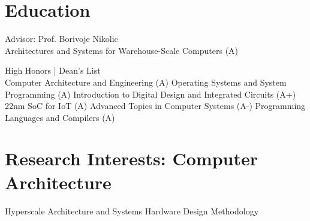 \documentclass[]{deedy-resume-openfont}
\begin{document}
%
%

%
%



\section{Education}


Advisor: Prof. Borivoje Nikolic
\vspace*{3pt}
\\
 Architectures and Systems for Warehouse-Scale Computers (A)

\vspace{6pt}

High Honors | Dean's List
\vspace*{3pt}
\\
 Computer Architecture and Engineering (A)
\textbullet{}
Operating Systems and System Programming (A)
\textbullet{}
Introduction to Digital Design and Integrated Circuits (A+)
\textbullet{}
22nm SoC for IoT (A)
\textbullet{}
Advanced Topics in Computer Systems (A-)
\textbullet{}
Programming Languages and Compilers (A)

\sectionsep

\section{Research Interests: Computer Architecture}
Hyperscale Architecture and Systems 
\textbullet{}
Hardware Design Methodology
\sectionsep
\end{document}
